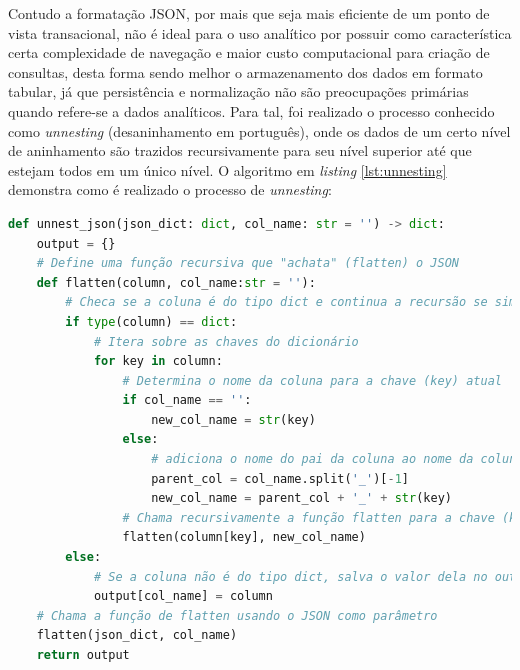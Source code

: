 
    Contudo a formatação JSON, por mais que seja mais eficiente de um ponto de vista transacional, não é ideal para o uso analítico por possuir como característica certa complexidade de navegação e maior custo computacional para criação de consultas, desta forma sendo melhor o armazenamento dos dados em formato tabular, já que persistência e normalização não são preocupações primárias quando refere-se a dados analíticos. Para tal, foi realizado o processo conhecido como \textit{unnesting} (desaninhamento em português), onde os dados de um certo nível de aninhamento são trazidos recursivamente para seu nível superior até que estejam todos em um único nível. O algoritmo em \textit{listing} \ref{lst:unnesting} demonstra como é realizado o processo de \textit{unnesting}:

\bigskip

\begin{lstlisting}[float = h, label={lst:unnesting},language=Python, caption=Algoritmo de \textit{unnesting} em \textit{python}.]
def unnest_json(json_dict: dict, col_name: str = '') -> dict:
    output = {}
    # Define uma função recursiva que "achata" (flatten) o JSON
    def flatten(column, col_name:str = ''):
        # Checa se a coluna é do tipo dict e continua a recursão se sim
        if type(column) == dict:
            # Itera sobre as chaves do dicionário
            for key in column:
                # Determina o nome da coluna para a chave (key) atual
                if col_name == '':
                    new_col_name = str(key)
                else:
                    # adiciona o nome do pai da coluna ao nome da coluna
                    parent_col = col_name.split('_')[-1]
                    new_col_name = parent_col + '_' + str(key)
                # Chama recursivamente a função flatten para a chave (key) atual
                flatten(column[key], new_col_name)
        else:
            # Se a coluna não é do tipo dict, salva o valor dela no output
            output[col_name] = column
    # Chama a função de flatten usando o JSON como parâmetro
    flatten(json_dict, col_name)
    return output
\end{lstlisting}

